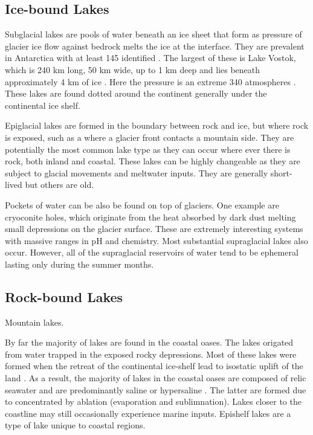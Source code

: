 \subsection{Ice-bound Lakes}
Subglacial lakes are pools of water beneath an ice sheet that form as pressure of glacier ice flow against bedrock melts the ice at the interface. 
They are prevalent in Antarctica with at least 145 identified \cite{Siegert2005}.
The largest of these is Lake Vostok, which is 240 km long, 50 km wide, up to 1 km deep and lies beneath approximately 4 km of ice \cite{Siegert2001}.
Here the pressure is an extreme 340 atmospheres \cite{Siegert2001}.
These lakes are found dotted around the continent generally under the continental ice shelf.%

Epiglacial lakes are formed in the boundary between rock and ice, but where rock is exposed, such as a where a glacier front contacts a mountain side.
They are potentially the most common lake type as they can occur where ever there is rock, both inland and coastal\cite{Hodgeson2012}. %
These lakes can be highly changeable as they are subject to glacial movements and meltwater inputs.
They are generally short-lived but others are old.

Pockets of water can be also be found on top of glaciers. 
One example are cryoconite holes, which originate from the heat absorbed by dark dust melting small depressions on the glacier surface. 
These are extremely interesting systems with massive ranges in pH and chemistry.
Most substantial supraglacial lakes also occur.
However, all of the supraglacial reservoirs of water tend to be ephemeral lasting only during the summer months.

\subsection{Rock-bound Lakes}
Mountain lakes. %

By far the majority of lakes are found in the coastal oases. %
The lakes origated from water trapped in the exposed rocky depressions.
Most of these lakes were formed when the retreat of the continental ice-shelf lead to isostatic uplift of the land \cite{Burton1981}. %
As a result, the majority of lakes in the coastal oases are composed of relic seawater and are predominantly saline or hypersaline \cite{Burke1988}.
The latter are formed due to concentrated by ablation (evaporation and sublimnation). %
Lakes closer to the coastline may still occasionally experience marine inputs. %
Epishelf lakes are a type of lake unique to coastal regions.

